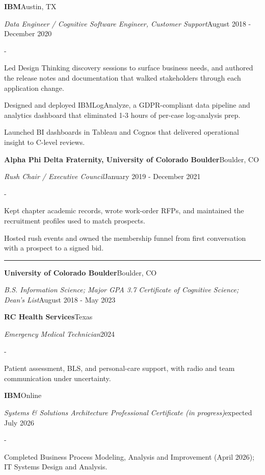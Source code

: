 \documentclass[10pt,letterpaper]{article}
\newenvironment{cvitems}{%
  \begin{list}{-}{%
    \setlength{\leftmargin}{12pt}%
    \setlength{\itemsep}{1.2pt}%
    \setlength{\parsep}{0pt}%
    \setlength{\topsep}{1.5pt}%
    \setlength{\partopsep}{0pt}%
    \setlength{\labelwidth}{6pt}%
    \setlength{\labelsep}{6pt}%
    \setlength{\itemindent}{0pt}%
  }%
}{\end{list}}
\newcommand{\cvsection}[1]{%
  \vspace{7pt}%
  \noindent{\bfseries\fontsize{11pt}{13pt}\selectfont\MakeUppercase{#1}}\par
  \vspace{1pt}%
  \noindent\rule{\textwidth}{0.4pt}\par
  \vspace{4pt}%
}
\newcommand{\cventryhead}[4]{%
  \noindent\textbf{#1}\hfill#2\par
  \vspace{0.5pt}%
  \noindent\textit{#3}\hfill#4\par
}
\newcommand{\cveduhead}[4]{%
  \noindent\textbf{#1}\hfill#2\par
  \vspace{0.5pt}%
  \noindent\textit{#3}\hfill#4\par
}
\begin{document}
\vspace{3pt}
\cventryhead{IBM}{Austin, TX}
{Data Engineer / Cognitive Software Engineer, Customer Support}{August 2018 - December 2020}
\begin{cvitems}
  \item Led Design Thinking discovery sessions to surface business needs, and authored the release notes and documentation that walked stakeholders through each application change.
  \item Designed and deployed IBMLogAnalyze, a GDPR-compliant data pipeline and analytics dashboard that eliminated 1-3 hours of per-case log-analysis prep.
  \item Launched BI dashboards in Tableau and Cognos that delivered operational insight to C-level reviews.
\end{cvitems}

\vspace{3pt}
\cventryhead{Alpha Phi Delta Fraternity, University of Colorado Boulder}{Boulder, CO}
{Rush Chair / Executive Council}{January 2019 - December 2021}
\begin{cvitems}
  \item Kept chapter academic records, wrote work-order RFPs, and maintained the recruitment profiles used to match prospects.
  \item Hosted rush events and owned the membership funnel from first conversation with a prospect to a signed bid.
\end{cvitems}

\cvsection{Education}

\cveduhead{University of Colorado Boulder}{Boulder, CO}
{B.S. Information Science; Major GPA 3.7 \textbar{} Certificate of Cognitive Science; Dean's List}{August 2018 - May 2023}

\vspace{3pt}
\cveduhead{RC Health Services}{Texas}
{Emergency Medical Technician}{2024}
\begin{cvitems}
  \item Patient assessment, BLS, and personal-care support, with radio and team communication under uncertainty.
\end{cvitems}

\vspace{3pt}
\cveduhead{IBM}{Online}
{Systems \& Solutions Architecture Professional Certificate (in progress)}{expected July 2026}
\begin{cvitems}
  \item Completed Business Process Modeling, Analysis and Improvement (April 2026); IT Systems Design and Analysis.
\end{cvitems}
\end{document}
